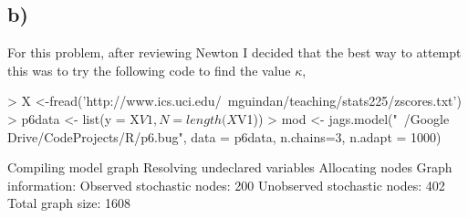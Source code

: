 \documentclass{article}
\begin{document}
\subsection*{b)} For this problem, after reviewing Newton I decided that the best way to attempt this was to try the following code to find the value $\kappa$, 
\begin{Schunk}
\begin{Sinput}
> X <-fread('http://www.ics.uci.edu/~mguindan/teaching/stats225/zscores.txt')
> p6data <-  list(y = X$V1, N = length(X$V1))
> mod <- jags.model("~/Google Drive/CodeProjects/R/p6.bug", data = p6data, n.chains=3, n.adapt = 1000)
\end{Sinput}
\begin{Soutput}
Compiling model graph
   Resolving undeclared variables
   Allocating nodes
Graph information:
   Observed stochastic nodes: 200
   Unobserved stochastic nodes: 402
   Total graph size: 1608


\end{Soutput}
\end{Schunk}
\end{document}
